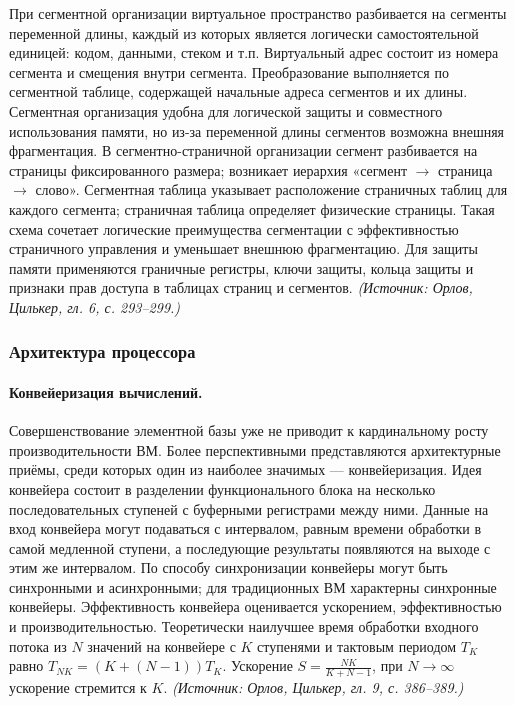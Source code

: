 \documentclass[a4paper,12pt]{article}
\begin{document}
При сегментной организации виртуальное пространство разбивается на сегменты переменной длины, каждый из которых является логически самостоятельной единицей: кодом, данными, стеком и т.п. Виртуальный адрес состоит из номера сегмента и смещения внутри сегмента. Преобразование выполняется по сегментной таблице, содержащей начальные адреса сегментов и их длины. Сегментная организация удобна для логической защиты и совместного использования памяти, но из-за переменной длины сегментов возможна внешняя фрагментация. В сегментно-страничной организации сегмент разбивается на страницы фиксированного размера; возникает иерархия «сегмент \(\to\) страница \(\to\) слово». Сегментная таблица указывает расположение страничных таблиц для каждого сегмента; страничная таблица определяет физические страницы. Такая схема сочетает логические преимущества сегментации с эффективностью страничного управления и уменьшает внешнюю фрагментацию. Для защиты памяти применяются граничные регистры, ключи защиты, кольца защиты и признаки прав доступа в таблицах страниц и сегментов.
\textit{(Источник: Орлов, Цилькер, гл. 6, с. 293--299.)}

\subsubsection{Архитектура процессора}

\paragraph{Конвейеризация вычислений.}
Совершенствование элементной базы уже не приводит к кардинальному росту производительности ВМ. Более перспективными представляются архитектурные приёмы, среди которых один из наиболее значимых --- конвейеризация. Идея конвейера состоит в разделении функционального блока на несколько последовательных ступеней с буферными регистрами между ними. Данные на вход конвейера могут подаваться с интервалом, равным времени обработки в самой медленной ступени, а последующие результаты появляются на выходе с этим же интервалом. По способу синхронизации конвейеры могут быть синхронными и асинхронными; для традиционных ВМ характерны синхронные конвейеры. Эффективность конвейера оценивается ускорением, эффективностью и производительностью. Теоретически наилучшее время обработки входного потока из \(N\) значений на конвейере с \(K\) ступенями и тактовым периодом \(T_K\) равно \(T_{NK}=(K+(N-1))T_K\). Ускорение \(S=\frac{NK}{K+N-1}\), при \(N\to\infty\) ускорение стремится к \(K\).
\textit{(Источник: Орлов, Цилькер, гл. 9, с. 386--389.)}
\end{document}
